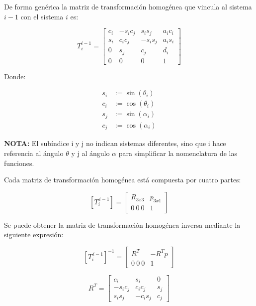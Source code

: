 \documentclass{article}
\begin{document}
De forma genérica la matriz de transformación homogénea que vincula al sistema $i-1$ con el sistema $i$ es:

\begin{equation}
T^{i-1}_i =
\begin{bmatrix}
c_i & -s_i c_j & s_i s_j & a_i 
c_i \\
s_i & c_i c_j  & -s_i s_j & a_i
s_i \\
0            & s_j               & c_j               & d_i \\
0            & 0                          & 0                          & 1
\end{bmatrix}
\label{eq:ci_2}
\end{equation}

Donde:

\begin{equation}
\begin{aligned}
    s_i &:= \sin(\theta_i) \\
    c_i &:= \cos(\theta_i) \\
    s_j &:= \sin(\alpha_i) \\
    c_j &:= \cos(\alpha_i) 
\end{aligned}
\end{equation}

\textbf{NOTA:} El subíndice i y j no indican sistemas diferentes, sino que i hace referencia al ángulo $\theta$ y j al ángulo $\alpha$ para simplificar la nomenclatura de las funciones.

Cada matriz de transformación homogénea está compuesta por cuatro partes:

\[
\left[T_i^{\,i-1}\right]
=
\begin{bmatrix}
R_{3x3} & p_{3x1} \\
0\ 0\ 0 & 1
\end{bmatrix}
\]

Se puede obtener la matriz de transformación homogénea inversa mediante la siguiente expresión:

\[
\left[T_i^{\,i-1}\right]^{-1}
=
\begin{bmatrix}
R^T & -R^Tp \\
0\ 0\ 0 & 1
\end{bmatrix}
\]

\[
R^T =
\begin{bmatrix}
c_i & s_i & 0 \\
- s_i c_j & c_i c_j & s_j \\
s_i s_j & -c_i s_j & c_j
\end{bmatrix}
\]
\end{document}
